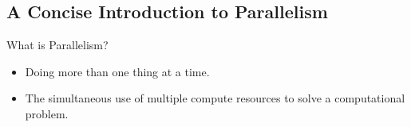 \subsection{A Concise Introduction to Parallelism}

\begin{frame}
  \begin{block}{What is Parallelism?}\pause
  \begin{itemize}
    \item Doing more than one thing at a time.
    \item The simultaneous use of multiple compute resources to solve a 
computational problem.
  \end{itemize}
  \end{block}
\end{frame}

